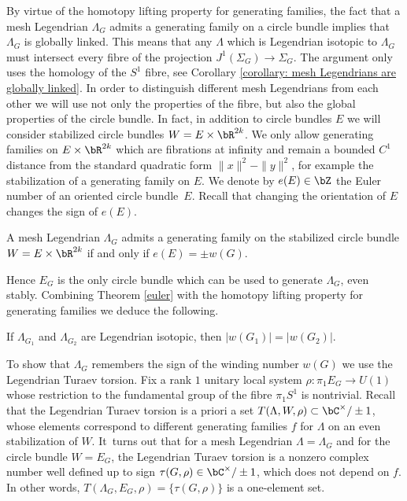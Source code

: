 By virtue of the homotopy lifting property for generating families, the fact that a mesh Legendrian $\Lambda_G$ admits a generating family on a circle bundle implies that $\Lambda_G$ is globally linked. This means that any $\Lambda$ which is Legendrian isotopic to $\Lambda_G$ must intersect every fibre of the projection $J^1(\Sigma_G) \to \Sigma_G$. The argument only uses the homology of the $S^1$ fibre, see Corollary \ref{corollary: mesh Legendrians are globally linked}. In order to distinguish different mesh Legendrians from each other we will use not only the properties of the fibre, but also the global properties of the circle bundle. In fact, in addition to circle bundles $E$ we will consider stabilized circle bundles $W=E \times \bR^{2k}$. We only allow generating families on $E \times \bR^{2k}$ which are fibrations at infinity and remain a bounded $C^1$ distance from the standard quadratic form $\|x\|^2-\|y\|^2$, for example the stabilization of a generating family on $E$. We denote by $e(E) \in \bZ$ the Euler number of an oriented circle bundle~$E$. Recall that changing the orientation of $E$ changes the sign of $e(E)$.

\begin{theorem}\label{euler} A mesh Legendrian $\Lambda_G$ admits a generating family on the stabilized circle bundle $W=E \times \bR^{2k}$ if and only if $e(E)=\pm w(G)$.
\end{theorem}

Hence $E_G$ is the only circle bundle which can be used to generate $\Lambda_G$, even stably. Combining Theorem \ref{euler} with the homotopy lifting property for generating families we deduce the following.

\begin{corollary}\label{reidemeister}
If $\Lambda_{G_1}$ and $\Lambda_{G_2}$ are Legendrian isotopic, then $|w(G_1)|=|w(G_2)|$.
\end{corollary}

To show that $\Lambda_G$ remembers the sign of the winding number $w(G)$ we use the Legendrian Turaev torsion. Fix a rank $1$ unitary local system $\rho: \pi_1 E_G \to U(1)$ whose restriction to the fundamental group of the fibre $\pi_1S^1$ is nontrivial. Recall that the Legendrian Turaev torsion is a priori a set $T(\Lambda, W, \rho) \subset \bC^\times / \pm 1$, whose elements correspond to different generating families $f$ for $\Lambda$ on an even stabilization of $W$. It~turns out that for a mesh Legendrian $\Lambda=\Lambda_G$ and for the circle bundle $W=E_G$, the Legendrian Turaev torsion is a nonzero complex number well defined up to sign $\tau(G, \rho) \in \bC^\times/ \pm 1$, which does not depend on $f$. In other words, $T(\Lambda_G,E_G,\rho)=\{\tau(G,\rho)\}$ is a one-element set.

